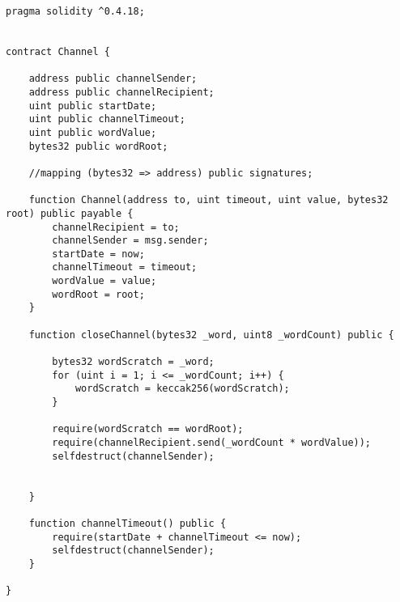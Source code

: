 \begin{lstlisting}[basicstyle=\scriptsize\ttfamily]
pragma solidity ^0.4.18;


contract Channel {

    address public channelSender;
    address public channelRecipient;
    uint public startDate;
    uint public channelTimeout;
    uint public wordValue;
    bytes32 public wordRoot;

    //mapping (bytes32 => address) public signatures;

    function Channel(address to, uint timeout, uint value, bytes32 root) public payable {
        channelRecipient = to;
        channelSender = msg.sender;
        startDate = now;
        channelTimeout = timeout;
        wordValue = value;
        wordRoot = root;
    }

    function closeChannel(bytes32 _word, uint8 _wordCount) public {

        bytes32 wordScratch = _word;
        for (uint i = 1; i <= _wordCount; i++) {
            wordScratch = keccak256(wordScratch);
        }

        require(wordScratch == wordRoot);
        require(channelRecipient.send(_wordCount * wordValue));
        selfdestruct(channelSender);


    }

    function channelTimeout() public {
        require(startDate + channelTimeout <= now);
        selfdestruct(channelSender);
    }

}
\end{lstlisting}









